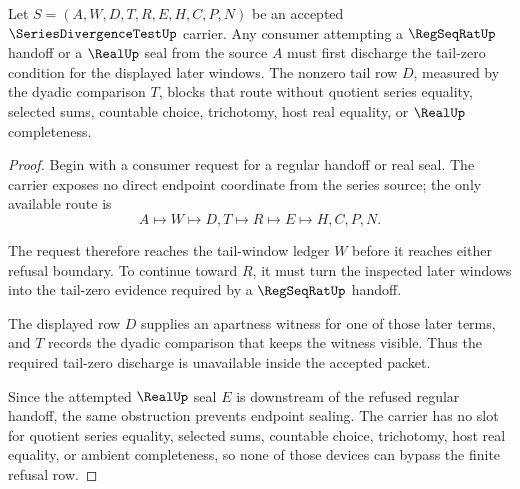 \begin{theorem}\label{thm:series-divergence-test-nonzero-tail-refusal}
Let $S=(A,W,D,T,R,E,H,C,P,N)$ be an accepted $\SeriesDivergenceTestUp$ carrier. Any consumer attempting a $\RegSeqRatUp$ handoff or a $\RealUp$ seal from the source $A$ must first discharge the tail-zero condition for the displayed later windows. The nonzero tail row $D$, measured by the dyadic comparison $T$, blocks that route without quotient series equality, selected sums, countable choice, trichotomy, host real equality, or $\RealUp$ completeness.
\end{theorem}
\begin{proof}
Begin with a consumer request for a regular handoff or real seal. The carrier exposes no direct endpoint coordinate from the series source; the only available route is
$$
A \longmapsto W \longmapsto D,T \longmapsto R \longmapsto E \longmapsto H,C,P,N .
$$

The request therefore reaches the tail-window ledger $W$ before it reaches either refusal boundary. To continue toward $R$, it must turn the inspected later windows into the tail-zero evidence required by a $\RegSeqRatUp$ handoff.

The displayed row $D$ supplies an apartness witness for one of those later terms, and $T$ records the dyadic comparison that keeps the witness visible. Thus the required tail-zero discharge is unavailable inside the accepted packet.

Since the attempted $\RealUp$ seal $E$ is downstream of the refused regular handoff, the same obstruction prevents endpoint sealing. The carrier has no slot for quotient series equality, selected sums, countable choice, trichotomy, host real equality, or ambient completeness, so none of those devices can bypass the finite refusal row.
\end{proof}



